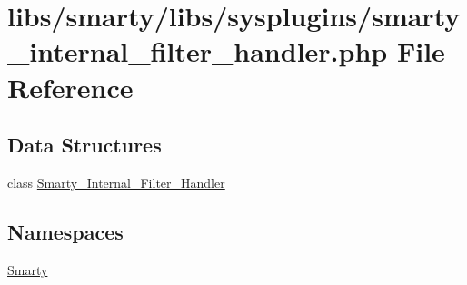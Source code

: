 \hypertarget{smarty__internal__filter__handler_8php}{}\section{libs/smarty/libs/sysplugins/smarty\+\_\+internal\+\_\+filter\+\_\+handler.php File Reference}
\label{smarty__internal__filter__handler_8php}
\subsection*{Data Structures}
\begin{DoxyCompactItemize}
\item 
class \hyperlink{class_smarty___internal___filter___handler}{Smarty\+\_\+\+Internal\+\_\+\+Filter\+\_\+\+Handler}
\end{DoxyCompactItemize}
\subsection*{Namespaces}
\begin{DoxyCompactItemize}
\item 
 \hyperlink{namespace_smarty}{Smarty}
\end{DoxyCompactItemize}
